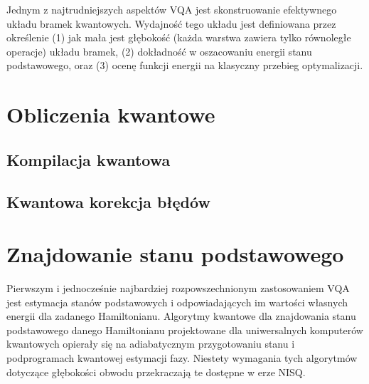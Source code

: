 \documentclass[a4paper,11pt]{article}
\begin{document}
Jednym z najtrudniejszych aspektów VQA jest skonstruowanie efektywnego układu bramek kwantowych. Wydajność tego układu jest definiowana przez określenie (1) jak mała jest głębokość (każda warstwa zawiera tylko równoległe operacje) układu bramek, (2) dokładność w oszacowaniu energii stanu podstawowego, oraz (3) ocenę funkcji energii na klasyczny przebieg optymalizacji.






\newpage


\section{Obliczenia kwantowe}
\newpage
\subsection{Kompilacja kwantowa}
\newpage
\subsection{Kwantowa korekcja błędów}

\newpage
\section{Znajdowanie stanu podstawowego}

Pierwszym i jednocześnie najbardziej rozpowszechnionym zastosowaniem VQA jest estymacja stanów podstawowych i odpowiadających im wartości własnych energii dla zadanego Hamiltonianu. Algorytmy kwantowe dla znajdowania stanu podstawowego danego Hamiltonianu projektowane dla uniwersalnych komputerów kwantowych opierały się na adiabatycznym przygotowaniu stanu i podprogramach kwantowej estymacji fazy. Niestety wymagania tych algorytmów dotyczące głębokości obwodu przekraczają te dostępne w erze NISQ.
\end{document}
